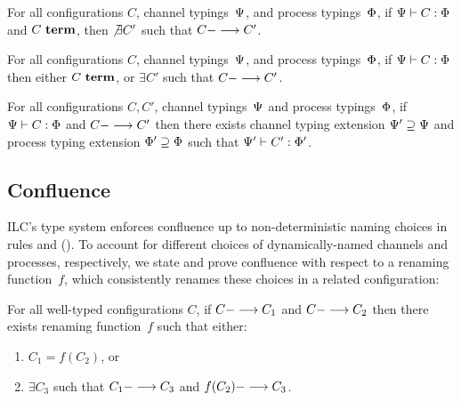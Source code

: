 
\begin{lemma}
For all configurations $C$,
channel typings~$\ChTy$,
and process typings~$\PrTy$,
%
if $\JCty{\StTy}{\ChTy}{C}{\PrTy}$
and $\JCterm{C}$,
then $\not\exists C'$ such that $\JCred{C}{C'}$.
\end{lemma}


\begin{theorem}[Progress]
For all configurations $C$,
channel typings~$\ChTy$,
and process typings~$\PrTy$,
%
if $\JCty{\StTy}{\ChTy}{C}{\PrTy}$
then 
either $\JCterm{C}$,
or $\exists C'$ such that $\JCred{C}{C'}$.
\end{theorem}

\begin{theorem}[Preservation]
For all configurations $C, C'$,
channel typings~$\ChTy$
and process typings~$\PrTy$,
%
 if $\JCty{\StTy}{\ChTy}{C}{\PrTy}$
and $\JCred{C}{C'}$ 
then there exists 
channel typing extension $\ChTy' \supseteq \ChTy$
and process typing extension $\PrTy' \supseteq \PrTy$
such that $\JCty{\StTy'}{\ChTy'}{C'}{\PrTy'}$.
\end{theorem}


\subsection{Confluence}

ILC's type system enforces confluence 
up to non-deterministic naming choices in 
rules  and  ().
%
To account for different choices of dynamically-named channels and processes, respectively, 
we state and prove confluence
with respect to a renaming function~$f$, which consistently renames
these choices in a related configuration:

\begin{theorem}
For all well-typed configurations $C$,
%
 if $\JCred{C}{C_1}$ 
and $\JCred{C}{C_2}$ 
then 
there exists renaming function~$f$ 
such that either:
\begin{enumerate}
\item %
$C_1 = f(C_2)$,
or
\item $\exists C_3$ such that $\JCred{C_1}{C_3}$ and $\JCred{f(C_2)}{C_3}$.
\end{enumerate}
\end{theorem}

